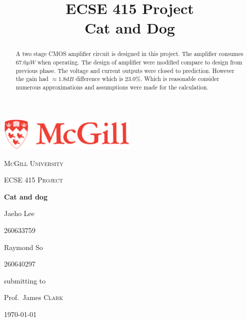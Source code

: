 \documentclass[conference,compsoc]{IEEEtran}
\begin{document}
\begin{titlepage}
	\centering
	\includegraphics[width=0.5\textwidth]{McGill_Logo}\par\vspace{1cm}
	{\scshape\LARGE McGill University \par}
	\vspace{1cm}
	{\scshape\Large ECSE 415 Project\par}
	\vspace{1.5cm}
	{\huge\bfseries Cat and dog\par}
	\vspace{2cm}
	{\Large Jaeho Lee\par}
	{ 260633759\par} {\Large Raymond So \par} {260640297 \par}
	\vfill
	submitting to\par
	Prof.~James \textsc{Clark}

	\vfill

	{\large \today\par}
\end{titlepage}
%
\title{ECSE 415 Project\\ Cat and Dog}
\author{
}

\maketitle

\begin{abstract}
A two stage CMOS amplifier circuit is designed in this project. The amplifier consumes \(67.0\mu W\) when operating. The design of amplifier were modified compare to design from previous phase. The voltage and current outputs were closed to prediction. However the gain had \(\approx 1.8 dB\) difference which is \(23.0 \%\). Which is reasonable consider numerous approximations and assumptions were made for the calculation.
\end{abstract}
\end{document}
